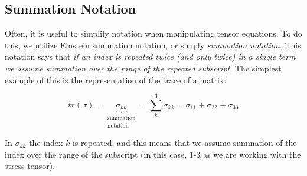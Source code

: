\subsection{Summation Notation}\label{sec:SummationNotation}

Often, it is useful to simplify notation when manipulating tensor equations. To do this, we utilize Einstein summation notation, or simply \emph{summation notation}. This notation says that \emph{if an index is repeated twice (and only twice) in a single term we assume summation over the range of the repeated subscript}. The simplest example of this is the representation of the trace of a matrix:

\[tr(\sigma) = \underbrace{\sigma_{kk}}_{\substack{\text{summation} \\ \text{notation}}} = \sum_{k}^{3}\sigma_{kk} = \sigma_{11}+\sigma_{22}+\sigma_{33}\]

In $\sigma_{kk}$ the index $k$ is repeated, and this means that we assume summation of the index over the range of the subscript (in this case, 1-3 as we are working with the stress tensor).

